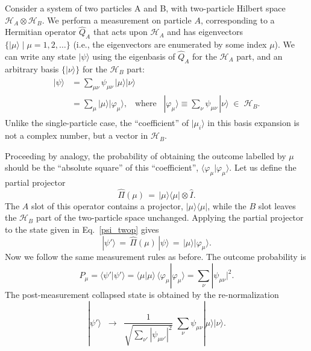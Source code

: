 \documentclass[pra,12pt]{revtex4}
\begin{document}
Consider a system of two particles A and B, with two-particle Hilbert
space $\mathscr{H}_A \otimes \mathscr{H}_B$.  We perform a measurement
on particle $A$, corresponding to a Hermitian operator $\hat{Q}_A$
that acts upon $\mathscr{H}_A$ and has eigenvectors $\{|\mu\rangle\;
|\; \mu = 1, 2, \dots\}$ (i.e., the eigenvectors are enumerated by
some index $\mu$).  We can write any state $|\psi\rangle$ using the
eigenbasis of $\hat{Q}_A$ for the $\mathscr{H}_A$ part, and an
arbitrary basis $\{|\nu\rangle\}$ for the $\mathscr{H}_B$ part:
\begin{align}
  \begin{aligned}
    |\psi\rangle &= \sum_{\mu\nu}
    \psi_{\mu\nu}\, |\mu\rangle |\nu\rangle \\
    &= \sum_\mu |\mu\rangle |\varphi_\mu \rangle,
    \;\;\;\mathrm{where}\;\;\;
    |\varphi_\mu\rangle\equiv \sum_\nu \psi_{\mu\nu}\,|\nu\rangle
    \;\in\; \mathscr{H}_B.
  \end{aligned}
  \label{psi_twop}
\end{align}
Unlike the single-particle case, the ``coefficient'' of
$|\mu_i\rangle$ in this basis expansion is not a complex number, but a
vector in $\mathscr{H}_B$.

Proceeding by analogy, the probability of obtaining the outcome
labelled by $\mu$ should be the ``absolute square'' of this
``coefficient'', $\langle\varphi_\mu|\varphi_\mu\rangle$.  Let us
define the partial projector
\begin{equation}
  \hat{\Pi}(\mu) \,=\, |\mu\rangle\langle \mu| \otimes  \hat{I}.
\end{equation}
The $A$ slot of this operator contains a projector,
$|\mu\rangle\langle \mu|$, while the $B$ slot leaves the
$\mathscr{H}_B$ part of the two-particle space unchanged.  Applying
the partial projector to the state given in Eq.~\eqref{psi_twop} gives
\begin{equation}
  |\psi'\rangle \,=\, \hat{\Pi}(\mu)\, |\psi\rangle
  \,=\, |\mu\rangle |\varphi_\mu\rangle.
\end{equation}
Now we follow the same measurement rules as before.  The outcome
probability is
\begin{equation}
  P_\mu = \langle\psi'|\psi'\rangle
  = \langle \mu|\mu\rangle\, \langle \varphi_\mu|\varphi_\mu\rangle
  = \sum_\nu |\psi_{\mu\nu}|^2.
\end{equation}
The post-measurement collapsed state is obtained by the
re-normalization
\begin{equation}
  |\psi'\rangle
  \;\;\rightarrow\;\;
  \frac{1}{\sqrt{\sum_{\nu'} |\psi_{\mu\nu'}|^2}}\;
  \sum_{\nu} \psi_{\mu\nu} |\mu\rangle |\nu\rangle.
\end{equation}
\end{document}

